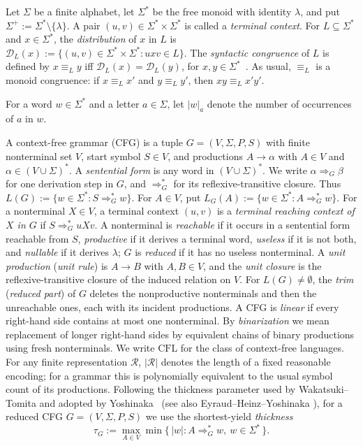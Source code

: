 \documentclass[11pt,a4paper]{article}
\theoremstyle{remark}
\theoremstyle{plain}
\newcommand{\D}{\mathcal{D}}
\begin{document}
Let $\Sigma$ be a finite alphabet, let $\Sigma^*$ be the free monoid with
identity $\lambda$, and put $\Sigma^+:=\Sigma^*\setminus\{\lambda\}$.
A pair $(u,v)\in\Sigma^*\times\Sigma^*$ is called a
\emph{terminal context}.  For $L\subseteq\Sigma^*$ and $x\in\Sigma^*$, the \emph{distribution} of $x$ in $L$ is
$\D_L(x):=\{(u,v)\in\Sigma^*\times\Sigma^*:uxv\in L\}$.
The \emph{syntactic congruence} of $L$ is defined by $x\equiv_L y$ iff
$\D_L(x)=\D_L(y)$, for $x,y\in\Sigma^*$~\cite[Chapter~III, Proposition~10.2]{eilenberg1974}.
As usual, $\equiv_L$ is a monoid congruence: if
$x\equiv_L x'$ and $y\equiv_L y'$, then $xy\equiv_L x'y'$.

For a word $w\in\Sigma^*$ and a letter $a\in\Sigma$, let $|w|_a$ denote
the number of occurrences of $a$ in $w$.

A context-free grammar (CFG) is a tuple $G=(V,\Sigma,P,S)$ with finite
nonterminal set $V$, start symbol $S\in V$, and productions
$A\to\alpha$ with $A\in V$ and $\alpha\in(V\cup\Sigma)^*$.
A \emph{sentential form} is any word in $(V\cup\Sigma)^*$.  We write
$\alpha\Rightarrow_G\beta$ for one derivation step in $G$, and
$\Rightarrow_G^*$ for its reflexive-transitive closure.  Thus $L(G):=\{w\in\Sigma^*:S\Rightarrow_G^*w\}$.  For $A\in V$, put
$L_G(A):=\{w\in\Sigma^*:A\Rightarrow_G^*w\}$.
For a nonterminal $X\in V$, a terminal context $(u,v)$ is a
\emph{terminal reaching context of $X$ in $G$} if
$S\Rightarrow_G^*uXv$.
A nonterminal is \emph{reachable} if it occurs in a sentential form reachable
from $S$, \emph{productive} if it derives a terminal word, \emph{useless}
if it is not both, and \emph{nullable} if it derives $\lambda$; $G$ is
\emph{reduced} if it has no useless nonterminal.  A \emph{unit production}
(\emph{unit rule}) is $A\to B$ with $A,B\in V$, and the \emph{unit closure}
is the reflexive-transitive closure of the induced relation on $V$.  For
$L(G)\ne\emptyset$, the \emph{trim} (\emph{reduced part}) of $G$ deletes
the nonproductive nonterminals and then the unreachable ones, each with its
incident productions.  A CFG is \emph{linear} if every right-hand side contains at
most one nonterminal.  By \emph{binarization} we mean replacement of longer
right-hand sides by equivalent chains of binary productions using fresh
nonterminals.
We write $\mathrm{CFL}$ for the class of context-free languages.  For any
finite representation $\mathcal R$, $|\mathcal R|$ denotes the length of a fixed reasonable
encoding; for a grammar this is polynomially equivalent to the usual symbol
count of its productions.  Following the thickness parameter used by
Wakatsuki--Tomita
\cite{wakatsuki-tomita1993} and adopted by Yoshinaka~\cite{yoshinaka2008}
(see also Eyraud--Heinz--Yoshinaka
\cite[Definition~2.11]{eyraud-heinz-yoshinaka2016}), for a reduced
CFG $G=(V,\Sigma,P,S)$ we use the shortest-yield \emph{thickness}
\[
 \tau_G:=\max_{A\in V}\min\{\,|w|:A\Rightarrow_G^*w,\ w\in\Sigma^*\,\}.
\]
\end{document}
